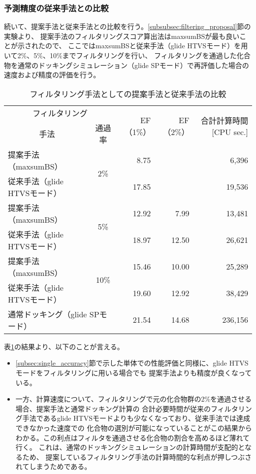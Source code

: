 \subsubsection{予測精度の従来手法との比較}\label{subsubsec:filtering_comparison}
続いて、提案手法と従来手法との比較を行う。\ref{subsubsec:filtering_proposal}節の実験より、
提案手法のフィルタリングスコア算出法はmaxsumBSが最も良いことが示されたので、
ここではmaxsumBSと従来手法（glide HTVSモード）を用いて2\%、5\%、10\%までフィルタリングを行い、
フィルタリングを通過した化合物を通常のドッキングシミュレーション（glide SPモード）で再評価した場合の
速度および精度の評価を行う。

\begin{table}[htb] \centering
	\caption{フィルタリング手法としての提案手法と従来手法の比較}
	\label{table:filtering_proposal_glide}
	\begin{tabular}{lc|rr|r|}
	\multicolumn{2}{c|}{フィルタリング}					&\multirow{2}{*}{EF（1\%）}	&\multirow{2}{*}{EF（2\%）}	&\multirow{2}{*}{合計計算時間 [CPU sec.]}	\\
	\multicolumn{1}{c}{手法}		&通過率				&						&						&									\\ \hline
	提案手法（maxsumBS）		&\multirow{2}{*}{2\%}	&8.75					&\textendash				&6,396								\\
	従来手法（glide HTVSモード）	&					&17.85					&\textendash				&19,536								\\
	提案手法（maxsumBS）		&\multirow{2}{*}{5\%}	&12.92					&7.99					&13,481								\\
	従来手法（glide HTVSモード）	&					&18.97					&12.50					&26,621								\\
	提案手法（maxsumBS）		&\multirow{2}{*}{10\%}	&15.46					&10.00					&25,289								\\
	従来手法（glide HTVSモード）	&					&19.60					&12.92					&38,429								\\ \hline
	\multicolumn{2}{l|}{通常ドッキング（glide SPモード）}	&21.54					&14.68					&236,156								\\ \hline
	\end{tabular}
\end{table}

表\ref{table:filtering_proposal_glide}の結果より、以下のことが言える。
\begin{itemize}
\item \ref{subsec:single_accuracy}節で示した単体での性能評価と同様に、glide HTVSモードをフィルタリングに用いる場合でも
	提案手法よりも精度が良くなっている。
\item 一方、計算速度について、フィルタリングで元の化合物群の2\%を通過させる場合、提案手法と通常ドッキング計算の
	合計必要時間が従来のフィルタリング手法であるglide HTVSモードよりも少なくなっており、従来手法では達成できなかった速度での
	化合物の選別が可能になっていることがこの結果からわかる。この利点はフィルタを通過させる化合物の割合を高めるほど薄れて行く。
	これは、通常のドッキングシミュレーションの計算時間が支配的となるため、
	提案しているフィルタリング手法の計算時間的な利点が押しつぶされてしまうためである。
\end{itemize}